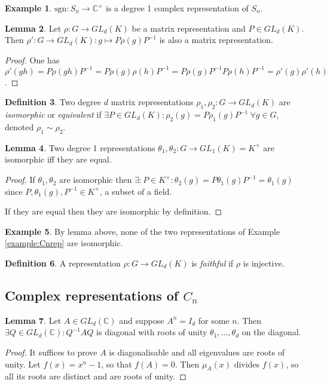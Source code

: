 \documentclass[a4paper]{article}
\newcommand{\sgn}{\text{sgn}}
\newcommand{\C}{\mathbb{C}}
\theoremstyle{definition}
\newtheorem{defn}{Definition}[subsection]
\newtheorem{lemma}[defn]{Lemma}
\newtheorem{example}[defn]{Example}
\begin{document}
\begin{example}
$\sgn:S_n\rightarrow \C^\times$ is a degree 1 complex representation of $S_n$.
\end{example}

\begin{lemma}
Let $\rho:G\rightarrow GL_d(K)$ be a matrix representation and $P\in GL_d(K)$. Then $\rho':G\rightarrow GL_d(K):g\mapsto P\rho(g)P^{-1}$ is also a matrix representation.
\end{lemma}
\begin{proof}
One has $\rho'(gh)=P\rho(gh)P^{-1}=P\rho(g)\rho(h)P^{-1}=P\rho(g)P^{-1}P\rho(h)P^{-1}=\rho'(g)\rho'(h)$.
\end{proof}

\begin{defn}
Two degree $d$ matrix representations $\rho_1,\rho_2:G\rightarrow GL_d(K)$ are \textit{isomorphic} or \textit{equivalent} if $\exists P\in GL_d(K):\rho_2(g)=P\rho_1(g)P^{-1} \ \forall g\in G$, denoted $\rho_1\sim\rho_2$.
\end{defn}

\begin{lemma}
Two degree 1 representations $\theta_1,\theta_2:G\rightarrow GL_1(K)=K^\times$ are isomorphic iff they are equal.
\end{lemma}
\begin{proof}
If $\theta_1,\theta_2$ are isomorphic then $\exists:P\in K^\times:\theta_2(g)=P\theta_1(g)P^{-1}=\theta_1(g)$ since $P,\theta_1(g),P^{-1}\in K^\times$, a subset of a field.

If they are equal then they are isomorphic by definition.
\end{proof}

\begin{example}
By lemma above, none of the two representations of Example \ref{example:Cnrep} are isomorphic.
\end{example}

\begin{defn}
A representation $\rho:G\rightarrow GL_d(K)$ is \textit{faithful} if $\rho$ is injective.
\end{defn}

\subsection{Complex representations of $C_n$}
\begin{lemma}
\label{lemma:finordmatdiagevrou}
Let $A\in GL_d(\C)$ and suppose $A^n=I_d$ for some $n$. Then $\exists Q\in GL_d(\C):Q^{-1}AQ$ is diagonal with roots of unity $\theta_1,\ldots,\theta_d$ on the diagonal.
\end{lemma}
\begin{proof}
It suffices to prove $A$ is diagonalisable and all eigenvalues are roots of unity. Let $f(x)=x^n-1$, so that $f(A)=0$. Then $\mu_A(x)$ divides $f(x)$, so all its roots are distinct and are roots of unity.
\end{proof}
\end{document}
